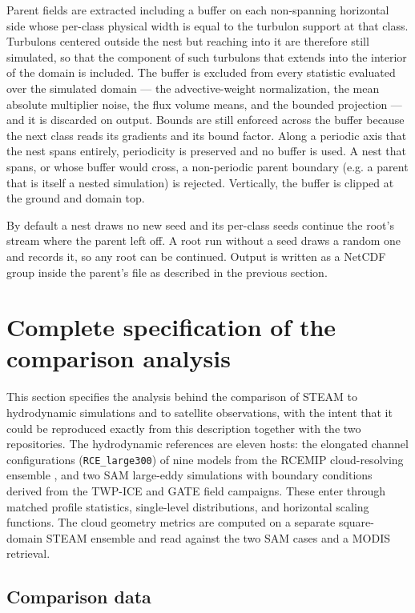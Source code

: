 \documentclass{article}
\begin{document}
Parent fields are extracted including a buffer on each non-spanning horizontal side whose per-class physical width is equal to the turbulon support at that
class. Turbulons centered outside the nest but reaching into it are therefore still simulated, so that the component of such turbulons that extends into the interior of the domain is included.
The buffer is excluded from every statistic
evaluated over the simulated domain --- the advective-weight
normalization, the mean absolute multiplier noise, the flux volume
means, and the bounded projection --- and it is discarded on output.
Bounds are still enforced across the buffer because the next class
reads its gradients and its bound factor. Along a periodic axis that the
nest spans entirely, periodicity is preserved and no buffer is used.
A nest that spans, or whose buffer would cross, a non-periodic parent
boundary (e.g. a parent that is itself a nested simulation) is rejected. Vertically, the buffer is
clipped at the ground and domain top.

By default a nest draws no new seed and its per-class seeds continue the
root's stream where the parent left off. A root run without a seed
draws a random one and records it, so any root can be continued.
Output is written as a NetCDF group inside the parent's file as
described in the previous section.

\section{Complete specification of the comparison analysis}
\label{sect:comparison analysis}

This section specifies the analysis behind the comparison of
STEAM to hydrodynamic simulations and to satellite observations, with
the intent that it could be reproduced exactly from this description
together with the two repositories. The hydrodynamic references are
eleven hosts: the elongated channel configurations (\texttt{RCE\_large300})
of nine models from the RCEMIP cloud-resolving ensemble
\citep{wing2018,wing2020}, and two SAM large-eddy simulations with boundary conditions derived from the TWP-ICE
and GATE field campaigns. These enter through matched profile statistics, single-level
distributions, and horizontal scaling functions. The cloud geometry
metrics are computed on a separate square-domain STEAM ensemble and
read against the two SAM cases and a MODIS retrieval.

\subsection{Comparison data}
\label{ssect:comparison data}
\end{document}
